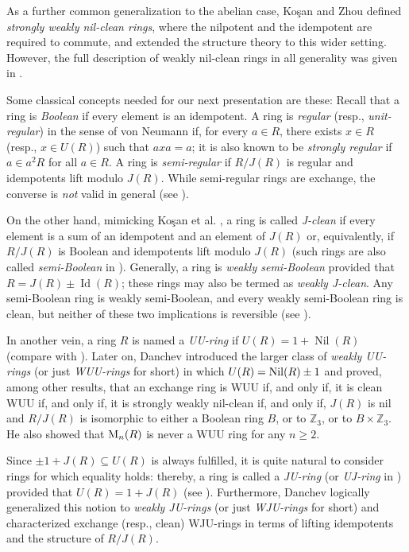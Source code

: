 \documentclass[12pt]{amsart}
\begin{document}
As a further common generalization to the abelian case, Ko\c{s}an and Zhou \cite{KZ} defined \textit{strongly weakly nil-clean rings}, where the nilpotent and the idempotent are required to commute, and extended the structure theory to this wider setting. However, the full description of weakly nil-clean rings in all generality was given in \cite{wuu}.

Some classical concepts needed for our next presentation are these: Recall that a ring is \textit{Boolean} if every element is an idempotent. A ring is \textit{regular} (resp., \textit{unit-regular}) in the sense of von Neumann if, for every \( a \in R \), there exists \( x \in R \) (resp., \( x \in U(R) \)) such that \( axa = a \); it is also known to be \textit{strongly regular} if \( a \in a^{2}R \) for all \( a \in R\). A ring is \textit{semi-regular} if \( R/J(R) \) is regular and idempotents lift modulo \( J(R) \). While semi-regular rings are exchange, the converse is {\it not} valid in general (see \cite{8}).

On the other hand, mimicking Ko\c{s}an et al. \cite{14}, a ring is called \textit{J-clean} if every element is a sum of an idempotent and an element of \( J(R) \) or, equivalently, if \( R/J(R) \) is Boolean and idempotents lift modulo \(J(R) \) (such rings are also called \textit{semi-Boolean} in \cite{25}). Generally, a ring is \textit{weakly semi-Boolean} provided that \( R = J(R) \pm \operatorname{Id}(R) \); these rings may also be termed as \textit{weakly J-clean}. Any semi-Boolean ring is weakly semi-Boolean, and every weakly semi-Boolean ring is clean, but neither of these two implications is reversible (see \cite{danchev1}).

In another vein, a ring \( R \) is named a \textit{UU-ring} if \( U(R) = 1 + \operatorname{Nil}(R) \) (compare with \cite{12}). Later on, Danchev \cite{wuu} introduced the larger class of \textit{weakly UU-rings} (or just {\it WUU-rings} for short) in which $U(R)={\rm Nil}(R)\pm 1$ and proved, among other results, that an exchange ring is WUU if, and only if, it is clean WUU if, and only if, it is strongly weakly nil-clean if, and only
if, \( J(R) \) is nil and \( R/J(R) \) is isomorphic to either a Boolean ring \( B \), or to \( \mathbb{Z}_3 \), or to \( B \times \mathbb{Z}_3 \). He also showed that \( {\rm M}_{n}(R) \) is never a WUU ring for any \( n \ge 2 \).

Since \( \pm 1 + J(R) \subseteq U(R) \) is always fulfilled, it is quite natural to consider rings for which equality holds: thereby, a ring is called a \textit{JU-ring} (or \textit{UJ-ring} in \cite{14}) provided that \( U(R) = 1 + J(R) \) (see \cite{D}). Furthermore, Danchev \cite{wuj} logically generalized this notion to
\textit{weakly JU-rings} (or just {\it WJU-rings} for short) and characterized exchange (resp., clean) WJU-rings in terms of lifting idempotents and the structure of \( R/J(R) \).
\end{document}
